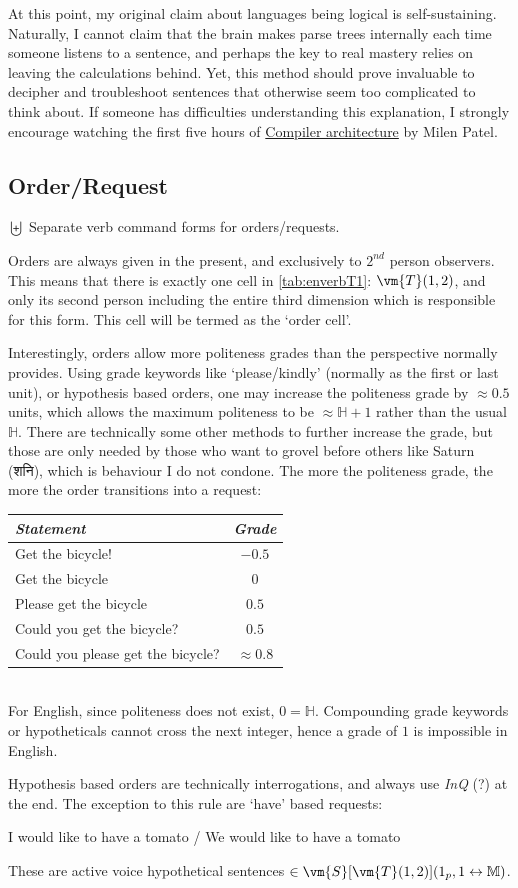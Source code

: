 At this point, my original claim about languages being logical is self-sustaining. Naturally, I cannot claim that the brain makes parse trees internally each time someone listens to a sentence, and perhaps the key to real mastery relies on leaving the calculations behind. Yet, this method should prove invaluable to decipher and troubleshoot sentences that otherwise seem too complicated to think about. If someone has difficulties understanding this explanation, I strongly encourage watching the first five hours of \href{https://www.youtube.com/watch?v=awsH0iq0O1A}{Compiler architecture} by Milen Patel.
\subsection{Order/Request}
$\biguplus$ Separate verb command forms for orders/requests.

Orders are always given in the present, and  exclusively to $2^{nd}$ person observers. This means that there is exactly one cell in \autoref{tab:enverbT1}: $\vm{T}(1,2)$, and only its second person including the entire third dimension which is responsible for this form. This cell will be termed as the `order cell'.

Interestingly, orders allow more politeness grades than the perspective normally provides. Using  grade keywords like `please/kindly' (normally as the first or last unit), or  hypothesis based orders, one may  increase the politeness grade by $\approx0.5$ units, which allows the maximum politeness to be $\approx\mathbb{H}+1$ rather than the usual $\mathbb{H}$. There are technically some other methods to further increase the grade, but those are only needed by those who want to grovel before others like Saturn (\textsanskrit{शनि}), which is behaviour I do not condone. The more the politeness grade, the more the order transitions into a request:
\begin{example}
    \begin{tabular}{m{7cm} c}
        \textit{Statement} & \textit{Grade}\\\hline
        Get the bicycle! & $-0.5$\\\hline
        Get the bicycle & $0$\\\hline
        Please get the bicycle & $0.5$\\\hline
        Could you get the bicycle? & $0.5$\\\hline
        Could you please get the bicycle? & $\approx0.8$\\\hline
    \end{tabular}
   \\  For English,  since politeness does not exist, $0=\mathbb{H}$. Compounding grade keywords or hypotheticals cannot cross the next integer, hence a grade of $1$ is impossible in English.
\end{example}
Hypothesis based orders are technically interrogations, and always use  \textit{InQ} (?) at the end. The exception to this rule are  `have' based requests: 
\begin{example}
I would like to have a tomato / We would like to have a tomato
\end{example}
These are  active voice hypothetical sentences $\in\vm{S}[\vm{T}(1,2)](1_p,1\leftrightarrow\mathbb{M})$.

